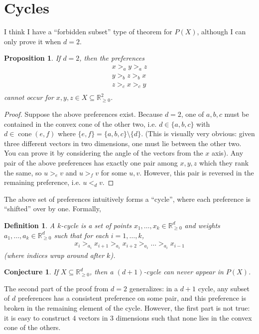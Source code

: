 \documentclass[12pt]{article}
\newtheorem*{definition}{Definition}
\newtheorem*{proposition}{Proposition}
\newtheorem*{conjecture}{Conjecture}
\newcommand{\Rgz}{\mathbb{R}_{\ge 0}}
\DeclareMathOperator*{\cone}{cone}
\newcommand{\1}[1]{\mathds{1}[{#1}]}
\begin{document}
\section{Cycles}

  I think I have a ``forbidden subset'' type of theorem for
  $P(X)$, although I can only prove it when $d=2$.

  \begin{proposition}
    If $d=2$, then the preferences
    \begin{align*}
      x >_a y >_a z \\
      y >_b z >_b x\\
      z >_c x >_c y\\
    \end{align*}
    cannot occur for $x,y,z\in X\subseteq \Rgz^2$.
  \end{proposition}
  \begin{proof}
    Suppose the above preferences exist.
    Because $d=2$, one of $a,b,c$ must be contained in the
    convex cone of the other two, i.e. $d \in \{a,b,c\}$
    with $d \in \cone(e,f)$ where $\{e,f\} = \{a,b,c\} \setminus \{d\}$.
    (This is visually very obvious: given three different
    vectors in two dimensions, one must lie between the other two.
    You can prove it by considering the angle of the vectors from the $x$ axis).
    Any pair of the above preferences has exactly one pair
    among $x,y,z$ which they rank the same, so
    $u >_e v$ and $u >_f v$ for some $u,v$.
    However, this pair is reversed in the remaining preference, i.e. $u <_d v$.
  \end{proof}

  The above set of preferences intuitively forms a ``cycle'',
  where each preference is ``shifted'' over by one. Formally,
  \begin{definition}
    A $k$-cycle is a set of points $x_1,\ldots, x_k\in \Rgz^d$ and weights 
    $a_1,\ldots, a_k \in \Rgz^d$ such that for each $i=1,\ldots,k$,
    \begin{align*}
      x_i >_{a_i} x_{i+1} >_{a_i} x_{i+2} >_{a_i} \ldots >_{a_i} x_{i-1}
    \end{align*}
    (where indices wrap around after $k$).
  \end{definition}

  \begin{conjecture}
    If $X \subseteq \Rgz^d$, then a $(d+1)$-cycle can never appear in $P(X)$.
  \end{conjecture}

  The second part of the proof from $d=2$ generalizes:
  in a $d+1$ cycle, any subset of $d$ preferences has a consistent preference
  on some pair, and this preference is broken in the remaining
  element of the cycle.
  However, the first part is not true: it is easy to construct $4$ vectors in
  $3$ dimensions such that none lies in the convex cone of the others.
\end{document}

